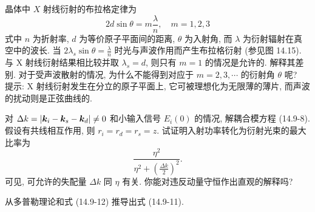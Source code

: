 \documentclass{note}
\begin{document}
\begin{exe}
    晶体中 $X$ 射线衍射的布拉格定律为
    \[
        2d\sin\theta=m\frac{\lambda}{n},\quad m=1,2,3
    \]
    式中 $n$ 为折射率, $d$ 为等价原子平面间的距离, $\theta$ 为入射角, 而 $\lambda$ 为衍射辐射在真空中的波长. 当 $2\lambda_s\sin\theta=\frac{\lambda}{n}$ 时光与声波作用而产生布拉格衍射 (参见图 14.15). 与 X 射线衍射结果相比较并取 $\lambda_s=d$, 则只有 $m=1$ 的情况是允许的. 解释其差别. 对于受声波散射的情况, 为什么不能得到对应于 $m=2,3,\cdots$ 的衍射角 $\theta$ 呢?\\
    提示: X 射线衍射发生在分立的原子平面上, 它可被理想化为无限薄的薄片, 而声波的扰动则是正弦曲线的.
\end{exe}
\begin{sol}
    
\end{sol}

\begin{exe}
    对 $\Delta k=\left\lvert\bm{k}_i-\bm{k}_s-\bm{k}_d\right\rvert\neq 0$ 和小输入信号 $E_i(0)$ 的情况, 解耦合模方程 (14.9-8). 假设有共线相互作用, 则 $r_i=r_d=r_s=z$. 试证明入射功率转化为衍射光束的最大比率为
    \[
        \frac{\eta^2}{\eta^2+\left(\frac{\Delta k}{2}\right)^2}.
    \]
    可见, 可允许的失配量 $\Delta k$ 同 $\eta$ 有关. 你能对违反动量守恒作出直观的解释吗?
\end{exe}
\begin{pf}
    
\end{pf}

\begin{exe}
    从多普勒理论和式 (14.9-12) 推导出式 (14.9-11).
\end{exe}
\begin{pf}
    
\end{pf}
\ifx\allfiles\undefined
\end{document}
